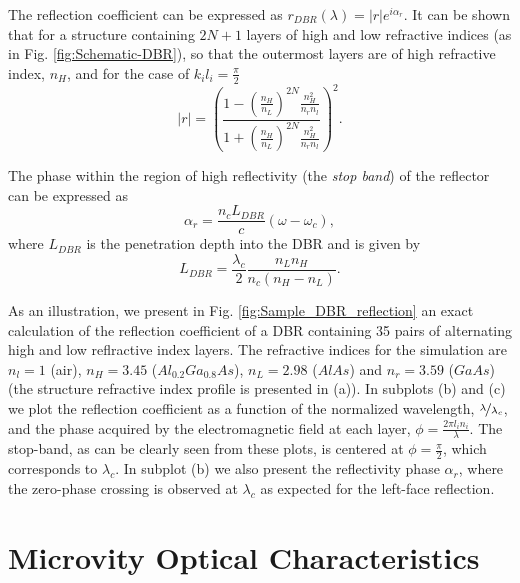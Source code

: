 The reflection coefficient can be expressed as $r_{DBR}(\lambda)=|r|e^{i\alpha_{r}}$.
It can be shown that for a structure containing $2N+1$ layers of
high and low refractive indices (as in Fig. \ref{fig:Schematic-DBR}),
so that the outermost layers are of high refractive index, $n_{H}$,
and for the case of $k_{i}l_{i}=\frac{\pi}{2}$ \begin{equation}
|r|=\left(\frac{1-\left(\frac{n_{H}}{n_{L}}\right)^{2N}\frac{n_{H}^{2}}{n_{r}n_{l}}}{1+\left(\frac{n_{H}}{n_{L}}\right)^{2N}\frac{n_{H}^{2}}{n_{r}n_{l}}}\right)^{2}.\end{equation}
%
\begin{lyxgreyedout}
The phase within the region of high reflectivity (the \emph{stop band})
of the reflector can be expressed as \begin{equation}
\alpha_{r}=\frac{n_{c}L_{DBR}}{c}\left(\omega-\omega_{c}\right),\end{equation}
where $L_{DBR}$ is the penetration depth into the DBR and is given
by \citet{Savona1995}\begin{equation}
L_{DBR}=\frac{\lambda_{c}}{2}\frac{n_{L}n_{H}}{n_{c}\left(n_{H}-n_{L}\right)}.\end{equation}

\end{lyxgreyedout}


As an illustration, we present in Fig. \ref{fig:Sample_DBR_reflection}
an exact calculation of the reflection coefficient of a DBR containing
35 pairs of alternating high and low reflractive index layers. The
refractive indices for the simulation are $n_{l}=1$ (air), $n_{H}=3.45$
($Al_{0.2}Ga_{0.8}As$), $n_{L}=2.98$ ($AlAs$) and $n_{r}=3.59$
($GaAs$) (the structure refractive index profile is presented in
(a)). In subplots (b) and (c) we plot the reflection coefficient as
a function of the normalized wavelength, $\nicefrac{\lambda}{\lambda_{c}}$,
and the phase acquired by the electromagnetic field at each layer,
$\phi=\frac{2\pi l_{i}n_{i}}{\lambda}$. The stop-band, as can be
clearly seen from these plots, is centered at $\phi=\frac{\pi}{2}$,
which corresponds to $\lambda_{c}$. In subplot (b) we also present
the reflectivity phase $\alpha_{r}$, where the zero-phase crossing
is observed at $\lambda_{c}$ as expected for the left-face reflection. 


\section{Microvity Optical Characteristics }


